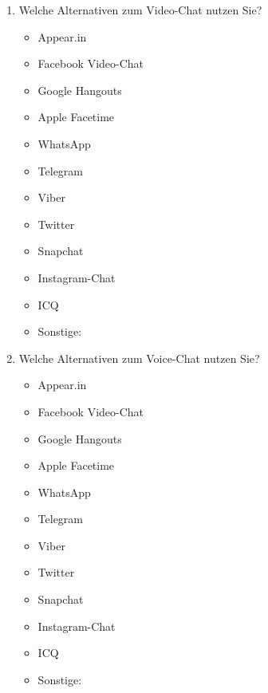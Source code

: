 
\begin{enumerate}[resume]
\item Welche Alternativen zum Video-Chat nutzen Sie?\label{App1:NutzenAlt}

		\begin{itemize}
		\item[\Circle] Appear.in
        \item[\Circle] Facebook Video-Chat
        \item[\Circle] Google Hangouts
        \item[\Circle] Apple Facetime
        \item[\Circle] WhatsApp
        \item[\Circle] Telegram
        \item[\Circle] Viber
        \item[\Circle] Twitter
        \item[\Circle] Snapchat
        \item[\Circle] Instagram-Chat
        \item[\Circle] ICQ
        \item[\Circle] Sonstige:~\underline{\hspace{7.5cm}}
        \end{itemize}


\item Welche Alternativen zum Voice-Chat nutzen Sie?

		\begin{itemize}
		\item[\Circle] Appear.in
        \item[\Circle] Facebook Video-Chat
        \item[\Circle] Google Hangouts
        \item[\Circle] Apple Facetime
        \item[\Circle] WhatsApp
        \item[\Circle] Telegram
        \item[\Circle] Viber
        \item[\Circle] Twitter
        \item[\Circle] Snapchat
        \item[\Circle] Instagram-Chat
        \item[\Circle] ICQ
        \item[\Circle] Sonstige:~\underline{\hspace{7.5cm}}
        \end{itemize}




\end{enumerate}

